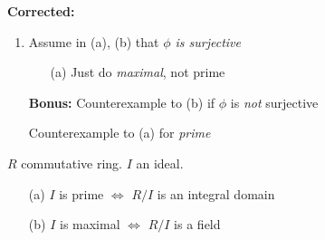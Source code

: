 \textbf{Corrected:}
\begin{enumerate}
\item Assume in (a), (b) that \emph{$\phi$ is surjective}
\begin{enumerate}
\item[(a)] Just do \emph{maximal}, not prime
\end{enumerate}
\item[\textbf{Bonus:}] Counterexample to (b) if $\phi$ is \emph{not} surjective
\item[\phantom{\textbf{Bonus:}}] Counterexample to (a) for \emph{prime}
\end{enumerate}

\thm $R$ commutative ring.  $I$ an ideal.
\begin{enumerate}
\item[(a)] $I$ is prime $\iff$ $R/I$ is an integral domain
\item[(b)] $I$ is maximal $\iff$ $R/I$ is a field
\end{enumerate}
\pf
